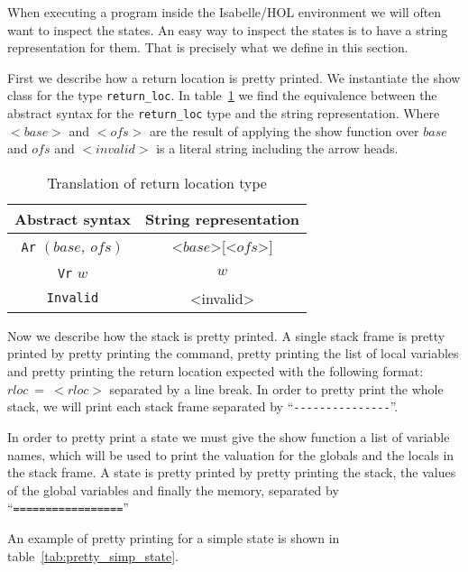When executing a program inside the Isabelle/HOL environment we will often want to inspect the states.
An easy way to inspect the states is to have a string representation for them.
That is precisely what we define in this section.

First we describe how a return location is pretty printed.
We instantiate the show class for the type \verb|return_loc|.
In table~\ref{tab:pretty_rloc} we find the equivalence between the abstract syntax for the \verb|return_loc| type and the string representation.
Where $<base>$ and $<ofs>$ are the result of applying the show function over $base$ and $ofs$ and $<invalid>$ is a literal string including the arrow heads.

\begin{table}[h!]
\centering
\begin{tabular}{|c|c|}
  \hline
  \textbf{Abstract syntax} & \textbf{String representation} \\ [0.5ex]
  \hline \hline
  \verb|Ar| $(base,\ ofs)$ & <$base$>[<$ofs$>] \\
  \verb|Vr| $w$ & $w$ \\
  \verb|Invalid| & <invalid> \\
  \hline
\end{tabular}

\caption{Translation of return location type}
\label{tab:pretty_rloc}
\end{table}

Now we describe how the stack is pretty printed.
A single stack frame is pretty printed by pretty printing the command, pretty printing the list of local variables and pretty printing the return location expected with the following format: $rloc\ =\ <rloc>$ separated by a line break.
In order to pretty print the whole stack, we will print each stack frame separated by ``\verb|---------------|''.


In order to pretty print a state we must give the show function a list of variable names, which will be used to print the valuation for the globals and the locals in the stack frame.
A state is pretty printed by pretty printing the stack, the values of the global variables and finally the memory, separated by ``\verb|=================|''

An example of pretty printing for a simple state is shown in table~\ref{tab:pretty_simp_state}.

